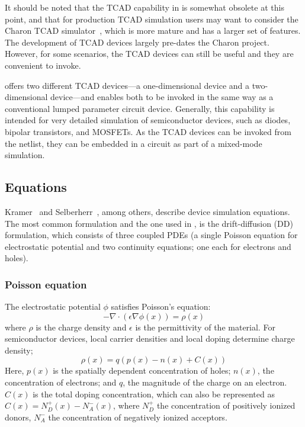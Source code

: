 It should be noted that the TCAD capability in \Xyce{} is somewhat obsolete at this point, 
and that for production TCAD simulation \Xyce{} users may want to consider the Charon TCAD simulator~\cite{charonPage}, which is more mature and has a larger set of features.
The development of \Xyce{} TCAD devices largely pre-dates the Charon project.
However, for some scenarios, the \Xyce{} TCAD devices can still be useful and they are convenient to invoke.

\Xyce{} offers two different TCAD devices---a one-dimensional 
device and a two-dimensional device---and enables both to be invoked in the 
same way as a conventional lumped parameter circuit device. Generally, this 
capability is intended for very detailed simulation of semiconductor devices, 
such as diodes, bipolar transistors, and MOSFETs. As the \Xyce{} TCAD devices can
be invoked from the netlist, they can be embedded in a circuit as part of
a mixed-mode simulation.

\subsection{Equations}
Kramer~\cite{Kramer} and Selberherr~\cite{selberherr}, among others, describe 
device simulation equations. The most common formulation and the one used in 
\Xyce{}, is the drift-diffusion (DD) formulation, which consists of three coupled
PDEs (a single Poisson equation for electrostatic potential and two continuity
equations; one each for electrons and holes).

\subsubsection{Poisson equation}
The electrostatic potential $\phi$ satisfies Poisson's equation:
\begin{equation}
  -\nabla \cdot \left(\epsilon \nabla \phi(x) \right) = \rho(x) \label{poisson1}
\end{equation}
where $\rho$ is the charge density and $\epsilon$ is the permittivity of the
material.  For semiconductor devices, local carrier densities and local doping determine charge density;
\begin{equation}
  \rho(x) = q(p(x)-n(x)+C(x)) \label{poisson2}
\end{equation} 
Here, $p(x)$ is the spatially dependent concentration of holes; $n(x)$, the
concentration of electrons; and $q$, the magnitude of the charge on an electron.
$C(x)$ is the total doping concentration, which can also be represented as
$C(x)=N^+_D(x)-N^-_A(x)$, where $N^+_D$ the concentration of positively ionized
donors, $N^-_A$ the concentration of negatively ionized acceptors.


